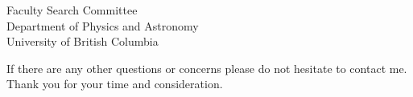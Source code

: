 \documentclass[12pt]{letter}
\begin{document}
\begin{letter}{
               Faculty Search Committee \\
               Department of Physics and Astronomy \\
               University of British Columbia
           }
%
%

    \normalsize
    If there are any other questions or concerns please do not hesitate to contact me.
    Thank you for your time and consideration.


\end{letter}
\end{document}
